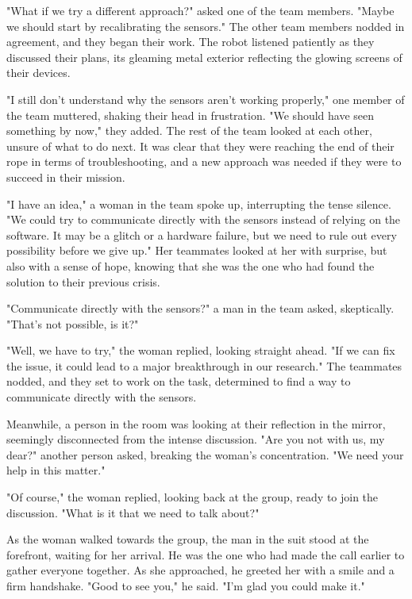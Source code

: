 \documentclass[smalldemyvopaper,11pt,twoside,onecolumn,openright,extrafontsizes]{memoir}
\begin{document}
"What if we try a different approach?" asked one of the team members. "Maybe we should start by recalibrating the sensors." The other team members nodded in agreement, and they began their work. The robot listened patiently as they discussed their plans, its gleaming metal exterior reflecting the glowing screens of their devices.\par
"I still don't understand why the sensors aren't working properly," one member of the team muttered, shaking their head in frustration. "We should have seen something by now," they added. The rest of the team looked at each other, unsure of what to do next. It was clear that they were reaching the end of their rope in terms of troubleshooting, and a new approach was needed if they were to succeed in their mission.\par
"I have an idea," a woman in the team spoke up, interrupting the tense silence. "We could try to communicate directly with the sensors instead of relying on the software. It may be a glitch or a hardware failure, but we need to rule out every possibility before we give up." Her teammates looked at her with surprise, but also with a sense of hope, knowing that she was the one who had found the solution to their previous crisis.\par
"Communicate directly with the sensors?" a man in the team asked, skeptically. "That's not possible, is it?"\par
"Well, we have to try," the woman replied, looking straight ahead. "If we can fix the issue, it could lead to a major breakthrough in our research." The teammates nodded, and they set to work on the task, determined to find a way to communicate directly with the sensors.\par
Meanwhile, a person in the room was looking at their reflection in the mirror, seemingly disconnected from the intense discussion. "Are you not with us, my dear?" another person asked, breaking the woman's concentration. "We need your help in this matter."\par
"Of course," the woman replied, looking back at the group, ready to join the discussion. "What is it that we need to talk about?"\par
As the woman walked towards the group, the man in the suit stood at the forefront, waiting for her arrival. He was the one who had made the call earlier to gather everyone together. As she approached, he greeted her with a smile and a firm handshake. "Good to see you," he said. "I'm glad you could make it."\par
\end{document}
